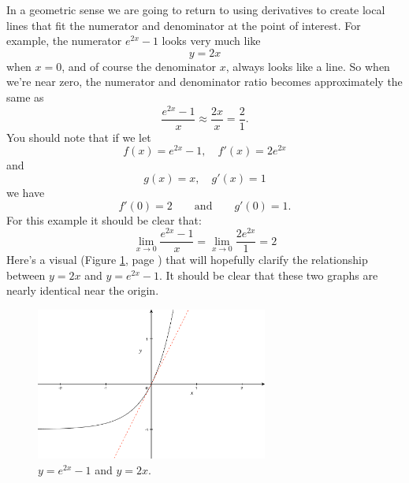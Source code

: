 \documentclass[12pt,addpoints, answers, fleqn]{exam}
\begin{document}
In a geometric sense we are going to return to using derivatives to create  local lines that fit the numerator and denominator at the point of interest. For example, the numerator $e^{2x} - 1$ looks very much like
\[
y = 2x
\]
when $x=0$, and of course the denominator $x$, always looks like a line. So when we're near zero, the numerator and denominator ratio becomes approximately the same as
\[
\frac{e^{2x} - 1}{x} \approx \frac{2x}{x} = \frac{2}{1}.
\]
You should note that if we let
\[
f \left( x \right) = e^{2x} - 1, \quad f' \left( x \right) = 2e^{2x}
\]
and
\[
g \left( x \right) = x, \quad g' \left( x \right) = 1
\]
we have
\[
f' \left( 0 \right) = 2 \qquad \mbox{and} \qquad g' \left( 0 \right) = 1.
\]
For this example it should be clear that:
\[
\mathop {\lim }\limits_{ x \to 0} \frac{e^{2x} - 1}{x}
= \mathop {\lim }\limits_{ x \to 0} \frac{2e^{2x}}{1} = 2
\]
Here's a visual (Figure \ref{fig:graph2203}, page \pageref{fig:graph2203}) that will hopefully clarify the relationship between $y=2x$ and $y= e^{2x} - 1$. It should be clear that these two graphs are nearly identical near the origin.
\begin{figure}[htbp] %
   \centering
   \includegraphics[width=3in]{./graphics/graph2203.pdf} 
   \caption{$\displaystyle y= e^{2x} - 1$ and $y=2x$.}
   \label{fig:graph2203}
\end{figure}   
\end{document}
